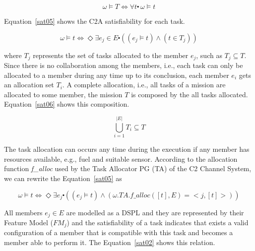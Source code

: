 \begin{center}
\begin{equation}
\label{}
\omega \models T \Longleftrightarrow \forall t \centerdot \ \omega \models t 
\end{equation}
\end{center}

Equation~\ref{sat05} shows the C2A satisfiability for each task. 

\begin{center}
\begin{equation}
\label{sat05}
\omega \models t \Longleftrightarrow  \Diamond \exists e_j \in E \centerdot  ((e_j \models t) \land (t \in T_j))
\end{equation}
\end{center}

where $T_j$ represents the set of tasks allocated to the member $e_j$, such as $T_j \subseteq T$. Since there is no collaboration among the members, i.e., each task can only be allocated to a member during any time up to its conclusion, each member $e_i$ gets an allocation set $T_i$. A complete allocation, i.e., all tasks of a mission are allocated to some member, the mission $T$ is composed by the all tasks allocated. Equation~\ref{sat06} shows this composition.

\begin{center}
\begin{equation}
\label{sat06}
\bigcup\limits ^{|E|}_{i=1} T_i \subseteq T
\end{equation}
\end{center}

The task allocation can occurs any time during the execution if any member has resources available, e.g., fuel and suitable sensor. According to the allocation function \textit{f\_alloc} used by the Task Allocator PG (TA) of the C2 Channel System, we can rewrite the Equation~\ref{sat05} as

\begin{center}
\begin{equation}
\label{sat05}
\omega \models t \Longleftrightarrow   \Diamond \exists e_j \centerdot ((e_j \models t) \land (\omega.TA.f\_alloc([t],E)=<j,[t]>))
\end{equation}
\end{center}

All members $e_j \in E$ are modelled as a DSPL and they are represented by their Feature Model ($FM_j$) and the satisfiability of a task indicates that exists a valid configuration of a member that is compatible with this task and becomes a member able to perform it. The Equation~\ref{sat02} shows this relation.

